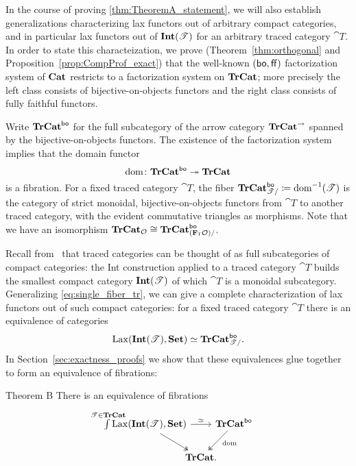 \documentclass[11pt,oneside,article]{memoir}
\begin{document}
In the course of proving \ref{thm:TheoremA_statement}, we will also establish generalizations
characterizing lax functors out of arbitrary compact categories, and in particular lax functors out
of $\mathbf{Int}(\mathscr{T})$ for an arbitrary traced category $\cat{T}$. In order to state this
characteization, we prove (Theorem~\ref{thm:orthogonal} and Proposition~\ref{prop:CompProf_exact})
that the well-known $(\mathsf{bo},\mathsf{ff})$ factorization system of $\mathbf{Cat}$ restricts to a factorization system
on $\mathbf{TrCat}$; more precisely the left class consists of bijective-on-objects functors and the right
class consists of fully faithful functors.

Write $\mathbf{TrCat}^{\mathsf{bo}}$ for the full subcategory of the arrow category $\mathbf{TrCat}^{\to}$ spanned by the
bijective-on-objects functors. The existence of the factorization system implies that the domain
functor
\[
  \operatorname{dom}\colon\mathbf{TrCat}^{\mathsf{bo}}\twoheadrightarrow\mathbf{TrCat}
\]
is a fibration. For a fixed traced category $\cat{T}$, the fiber
$\mathbf{TrCat}^{\mathsf{bo}}_{\mathscr{T}/}\coloneqq\operatorname{dom}^{-1}(\mathscr{T})$ is the category of strict monoidal,
bijective-on-objects functors from $\cat{T}$ to another traced category, with the evident
commutative triangles as morphisms. Note that we have an isomorphism
$\mathbf{TrCat}_{\mathcal{O}}\cong\mathbf{TrCat}^{\mathsf{bo}}_{(\mathbf{F}_{\mathsf{T}}\mathcal{O})/}$.

Recall from~\cite{JoyalStreetVerity} that traced categories can be thought of as full subcategories
of compact categories: the Int construction applied to a traced category $\cat{T}$ builds the
smallest compact category $\mathbf{Int}(\mathscr{T})$ of which $\cat{T}$ is a monoidal subcategory. Generalizing
\eqref{eq:single_fiber_tr}, we can give a complete characterization of lax functors out of such
compact categories: for a fixed traced category $\cat{T}$ there is an equivalence of categories
\[
  \operatorname{Lax}(\mathbf{Int}(\mathscr{T}),\mathbf{Set})\simeq\mathbf{TrCat}^{\mathsf{bo}}_{\mathscr{T}/}.
\]
In Section~\ref{sec:exactness_proofs} we show that these equivalences glue together to form an
equivalence of fibrations:

\begin{named}{Theorem B}
    \label{thm:TheoremB_statement}
  There is an equivalence of fibrations
  \begin{equation*}
    \begin{tikzcd}[column sep=-1em]
      \int\limits^{\mathclap{\cat{T}\in\TrCat}} \Lax(\Int(\cat{T}),\Set)
        \ar[rr,"\equiv"] \ar[dr,two heads]
      && \TrCat^{\bo} \ar[dl,two heads,"\dom" pos=.4] \\
      & \TrCat. &
    \end{tikzcd}
  \end{equation*}
\end{named}
\end{document}
